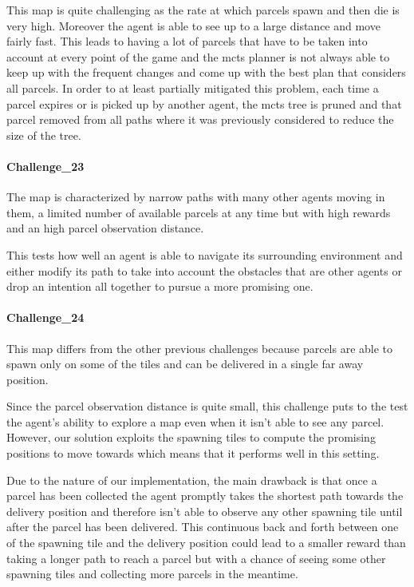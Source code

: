 This map is quite challenging as the rate at which parcels spawn and then die is very high. Moreover the agent is able to see up to a large distance and move fairly fast. This leads to having a lot of parcels that have to be taken into account at every point of the game and the mcts planner is not always able to keep up with the frequent changes and come up with the best plan that considers all parcels. In order to at least partially mitigated this problem, each time a parcel expires or is picked up by another agent, the mcts tree is pruned and that parcel removed from all paths where it was previously considered to reduce the size of the tree.


\paragraph{Challenge\_23} The map is characterized by narrow paths with many other agents moving in them, a limited number of available parcels at any time but with high rewards and an high parcel observation distance. 

This tests how well an agent is able to navigate its surrounding environment and either modify its path to take into account the obstacles that are other agents or drop an intention all together to pursue a more promising one.  


\paragraph{Challenge\_24} This map differs from the other previous challenges because parcels are able to spawn only on some of the tiles and can be delivered in a single far away position.

Since the parcel observation distance is quite small, this challenge puts to the test the agent's ability to explore a map even when it isn't able to see any parcel. However, our solution exploits the spawning tiles to compute the promising positions to move towards which means that it performs well in this setting.

Due to the nature of our implementation, the main drawback is that once a parcel has been collected the agent promptly takes the shortest path towards the delivery position and therefore isn't able to observe any other spawning tile until after the parcel has been delivered. This continuous back and forth between one of the spawning tile and the delivery position could lead to a smaller reward than taking a longer path to reach a parcel but with a chance of seeing some other spawning tiles and collecting more parcels in the meantime.


